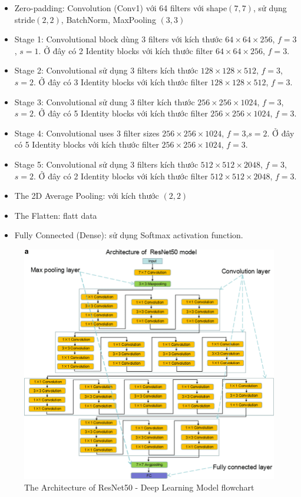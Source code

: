 \documentclass{article}
\begin{document}
	\begin{itemize}
		\item Zero-padding: Convolution (Conv1) với 64 filters với shape$(7,7)$, sử dụng stride$(2,2)$, BatchNorm, MaxPooling $(3,3)$
		\item Stage 1: Convolutional block dùng 3 filters với kích thước $64 \times 64 \times 256$, $f=3$, $s=1$. Ở đây có 2 Identity blocks với kích thước filter $64 \times 64 \times 256$, $f=3$.
		\item Stage 2: Convolutional sử dụng 3 filters kích thước $128 \times 128 \times 512$, $f=3$,$s=2$. Ở đây có 3 Identity blocks với kích thước filter $128 \times 128 \times 512$, $f=3$.
		\item Stage 3: Convolutional sử dung 3 filter kích thước $256\times256\times1024$, $f=3$,$s=2$. Ở đây có 5 Identity blocks với kích thước filter $256\times256\times1024$, $f=3$.
		\item Stage 4: Convolutional uses 3 filter sizes $256\times256\times1024$, $f=3$,$s=2$. Ở đây có 5 Identity blocks với kích thước filter $256\times256\times1024$, $f=3$.
		\item Stage 5: Convolutional sử dụng 3 filters kích thước $512\times512\times2048$, $f=3$,$s=2$. Ở đây có 2 Identity blocks với kích thước filter $512\times512\times2048$, $f=3$.
		\item The 2D Average Pooling: với kích thước $(2, 2)$
		\item The Flatten: flatt data
		\item Fully Connected (Dense): sử dụng Softmax activation function.
	\end{itemize}
	\begin{figure}[H]
		\centering
		\includegraphics[width=0.85\linewidth]{architecture/The-architecture-of-ResNet50-and-deep-learning-model-flowchart-a-b-Architecture-of.png}
		\caption{The Architecture of ResNet50 - Deep Learning Model flowchart}
		\label{fig:writing-thesis}
	\end{figure}
\end{document}
